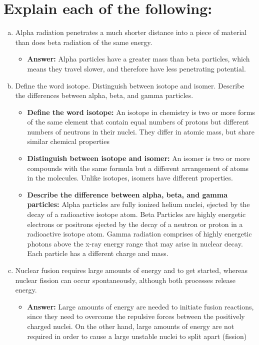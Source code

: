 \documentclass[11pt]{article}
\begin{document}
\section{Explain each of the following:}
\label{sec:org64b89e6}
\begin{enumerate}[(a)]
\item Alpha radiation penetrates a much shorter distance into a piece of
material than does beta radiation of the same energy.
\begin{itemize}
\item \textbf{Answer:} Alpha particles have a greater mass than beta particles, which means they travel slower, and therefore have less penetrating potential.
\end{itemize}

\item Define the word isotope. Distinguish between isotope and isomer. Describe
the differences between alpha, beta, and gamma particles.
\begin{itemize}
\item \textbf{Define the word isotope:} An isotope in chemistry is two or more forms of the same element that
contain equal numbers of protons but different numbers of neutrons in
their nuclei. They differ in atomic mass, but share similar chemical properties
\item \textbf{Distinguish between isotope and isomer:} An isomer is two or more compounds with the same formula but a different arrangement of atoms in the molecules. Unlike isotopes, isomers have different properties.
\item \textbf{Describe the difference between alpha, beta, and gamma particles:}
Alpha particles are fully ionized helium nuclei, ejected by the decay
of a radioactive isotope atom. Beta Particles are highly energetic
electrons or positrons ejected by the decay of a neutron or proton in
a radioactive isotope atom. Gamma radiation comprises of highly
energetic photons above the x-ray energy range that may arise in nuclear decay. Each particle has a different charge and mass.
\end{itemize}

\item Nuclear fusion requires large amounts of energy and to get started,
whereas nuclear fission can occur spontaneously, although both processes
release energy.
\begin{itemize}
\item \textbf{Answer:} Large amounts of energy are needed to initiate fusion reactions, since
they need to overcome the repulsive forces between the positively
charged nuclei. On the other hand, large amounts of energy are not required in order to cause a large unstable nuclei to split apart (fission)
\end{itemize}


\end{enumerate}
\end{document}
